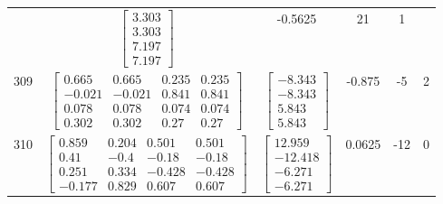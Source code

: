 \documentclass[a4paper,12pt]{article}
\begin{document}
\begin{tabular}{c c c c c c}
&
$\begin{bmatrix} 3.303 \\ 3.303 \\ 7.197 \\ 7.197 \end{bmatrix}$
&
-0.5625
&
21
&
1
\\
309
&
$\begin{bmatrix} 0.665 & 0.665 & 0.235 & 0.235 \\ -0.021 & -0.021 & 0.841 & 0.841 \\ 0.078 & 0.078 & 0.074 & 0.074 \\ 0.302 & 0.302 & 0.27 & 0.27 \end{bmatrix}$
&
$\begin{bmatrix} -8.343 \\ -8.343 \\ 5.843 \\ 5.843 \end{bmatrix}$
&
-0.875
&
-5
&
2
\\
310
&
$\begin{bmatrix} 0.859 & 0.204 & 0.501 & 0.501 \\ 0.41 & -0.4 & -0.18 & -0.18 \\ 0.251 & 0.334 & -0.428 & -0.428 \\ -0.177 & 0.829 & 0.607 & 0.607 \end{bmatrix}$
&
$\begin{bmatrix} 12.959 \\ -12.418 \\ -6.271 \\ -6.271 \end{bmatrix}$
&
0.0625
&
-12
&
0
\\
\end{tabular} \egroup \newpage
\end{document}
